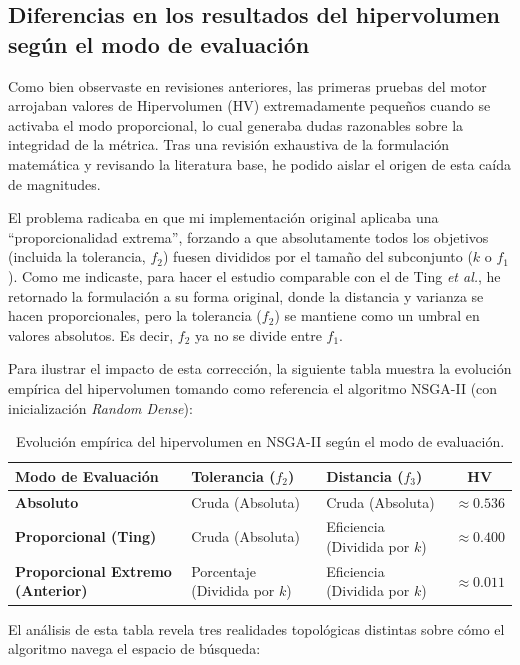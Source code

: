 \documentclass[11pt,a4paper]{article}
\begin{document}
\subsection{Diferencias en los resultados del hipervolumen según el modo de evaluación}

Como bien observaste en revisiones anteriores, las primeras pruebas del motor arrojaban valores de Hipervolumen (HV) extremadamente pequeños cuando se activaba el modo proporcional, lo cual generaba dudas razonables sobre la integridad de la métrica. Tras una revisión exhaustiva de la formulación matemática y revisando la literatura base, he podido aislar el origen de esta caída de magnitudes.

El problema radicaba en que mi implementación original aplicaba una ``proporcionalidad extrema'', forzando a que absolutamente todos los objetivos (incluida la tolerancia, $f_2$) fuesen divididos por el tamaño del subconjunto ($k$ o $f_1$). Como me indicaste, para hacer el estudio comparable con el de Ting \textit{et al.}, he retornado la formulación a su forma original, donde la distancia y varianza se hacen proporcionales, pero la tolerancia ($f_2$) se mantiene como un umbral en valores absolutos. Es decir, $f_2$ ya no se divide entre $f_1$.

Para ilustrar el impacto de esta corrección, la siguiente tabla muestra la evolución empírica del hipervolumen tomando como referencia el algoritmo NSGA-II (con inicialización \textit{Random Dense}):

\begin{table}[h!]
\centering
\begin{tabular}{lllc}
\toprule
\textbf{Modo de Evaluación} & \textbf{Tolerancia ($f_2$)} & \textbf{Distancia ($f_3$)} & \textbf{HV} \\
\midrule
\textbf{Absoluto} & Cruda (Absoluta) & Cruda (Absoluta) & $\approx 0.536$ \\
\textbf{Proporcional (Ting)} & Cruda (Absoluta) & Eficiencia (Dividida por $k$) & $\approx 0.400$ \\
\textbf{Proporcional Extremo (Anterior)} & Porcentaje (Dividida por $k$) & Eficiencia (Dividida por $k$) & $\approx 0.011$ \\
\bottomrule
\end{tabular}
\caption{Evolución empírica del hipervolumen en NSGA-II según el modo de evaluación.}
\end{table}

El análisis de esta tabla revela tres realidades topológicas distintas sobre cómo el algoritmo navega el espacio de búsqueda:
\end{document}
